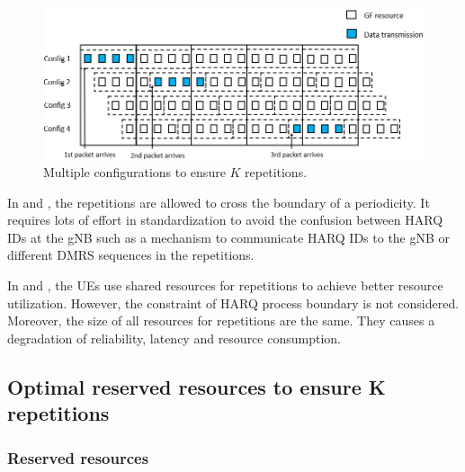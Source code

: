 \documentclass{ieeeaccess}
\begin{document}
\begin{figure}[htbp]
\centerline{\includegraphics[scale=0.4]{fig14.PNG}}
\caption{Multiple configurations to ensure $K$ repetitions.}
\label{fig14}
\vspace{-4mm}
\end{figure}


In \cite{ref8} and \cite{ref9}, the repetitions are allowed to cross the boundary of a periodicity. It requires lots of effort in standardization to avoid the confusion between HARQ IDs at the gNB such as a mechanism to communicate HARQ IDs to the gNB or different DMRS sequences in the repetitions.

In \cite{ref10} and \cite{ref11}, the UEs use shared resources for repetitions to achieve better resource utilization. However, the constraint of HARQ process boundary is not considered. Moreover, the size of all resources for repetitions are the same. They causes a degradation of reliability, latency and resource consumption.

\subsection{Optimal reserved resources to ensure K repetitions}\label{IIIB}

\subsubsection {Reserved resources}
\end{document}
